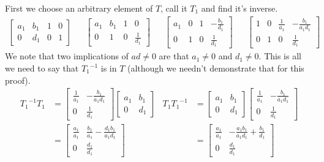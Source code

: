 \documentclass[letterpaper]{article}
\begin{document}
\begin{enumerate}
\begin{enumerate}
\begin{enumerate}
      First we choose an arbitrary element of $T$, call it $T_1$ and find it's inverse.
      \begin{align*}
        \left[\begin{array}{cc|cc}a_1&b_1&1&0\\0&d_1&0&1\end{array}\right]&&
        \left[\begin{array}{cc|cc}a_1&b_1&1&0\\0&1&0&\frac{1}{d_1}\end{array}\right]&&
        \left[\begin{array}{cc|cc}a_1&0&1&-\frac{b_1}{d_1}\\0&1&0&\frac{1}{d_1}\end{array}\right]&&
        \left[\begin{array}{cc|cc}1&0&\frac{1}{a_1}&-\frac{b_1}{a_1d_1}\\0&1&0&\frac{1}{d_1}\end{array}\right]
      \end{align*}
      We note that two implications of $ad\ne 0$ are that $a_1\ne 0$ and $d_1\ne 0$. This is all we need to say that ${T_1}^{-1}$ is in $T$ (although we needn't demonstrate that for this proof).
      \begin{align*}
        {T_1}^{-1}T_1&=
        \left[\begin{array}{cc}\frac{1}{a_1}&-\frac{b_1}{a_1d_1}\\0&\frac{1}{d_1}\end{array}\right]
        \left[\begin{array}{cc}a_1&b_1\\0&d_1\end{array}\right]&
        T_1{T_1}^{-1}&=
        \left[\begin{array}{cc}a_1&b_1\\0&d_1\end{array}\right]
        \left[\begin{array}{cc}\frac{1}{a_1}&-\frac{b_1}{a_1d_1}\\0&\frac{1}{d_1}\end{array}\right]\\
        &=\left[\begin{array}{cc}\frac{a_1}{a_1}&\frac{b_1}{a_1}-\frac{d_1b_1}{a_1d_1}\\0&\frac{d_1}{d_1}\end{array}\right]&
        &=\left[\begin{array}{cc}\frac{a_1}{a_1}&-\frac{a_1b_1}{a_1d_1}+\frac{b_1}{d_1}\\0&\frac{d_1}{d_1}\end{array}\right]\\

\end{align*}
\end{enumerate}
\end{enumerate}
\end{enumerate}
\end{document}
